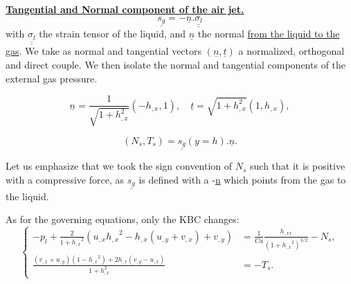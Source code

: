 \documentclass[12pt]{article}
\begin{document}
\underline{\textbf{Tangential and Normal component of the air jet.}}
\begin{equation}
    \underline{s_g}= -\underline{n}.\underline{\underline{\sigma_l}}
\end{equation}
with $\underline{\underline{\sigma_l}}$ the strain tensor of the liquid, and $\underline{n}$ 
the normal \underline{from the liquid to the gas}. We take as normal and tangential vectors $(\underline{n}, \underline{t})$ a normalized, orthogonal and direct couple. We then isolate the normal and tangential components of the external gas pressure. 

 \begin{equation}
     \underline{n}=\frac{1}{\sqrt{1+h_{,x}^2}}(-h_{,x}, 1), \quad \underline{t} = \sqrt{1+h_{,x}^2}(1, h_{,x}),
 \end{equation}

\begin{equation}
    \boxed{
    (N_s, T_s) =  \underline{s_g}(y=h).\underline{n}.
    }
\end{equation}

Let us emphasize that we took the sign convention of $N_s$ such that it is positive with a compressive force, as
 $\underline{s_g}$ is defined with a -\underline{n} which points from the gas to the liquid. 

As for the governing equations, only the KBC changes: 
\begin{equation}\label{eq DBC_Control}
    \left\{
    \begin{aligned}
    -p_l + \frac{2}{1+{h_{,x}}^2}(u_{,x}{h_{,x}}^2 - h_{,x}(u_{,y} + v_{,x})+v_{,y}) &= \frac{1}{Ca} \frac{h_{,xx}}{(1+{h_{,x}}^2)^{3/2}}-N_s, \\
    \frac{(v_{,x} + u_{,y})(1-{h_{,x}}^2)+2h_{,x}(v_{,y}-u_{,x})}{1+h_{,x}^2} &= -T_s.
    \end{aligned}
    \right.
\end{equation}
\end{document}
